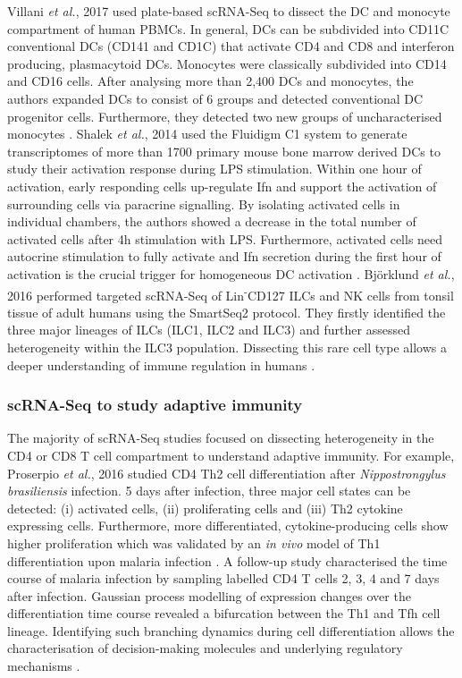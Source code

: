 Villani \emph{et al.}, 2017 used plate-based scRNA-Seq to dissect the \gls{DC} and monocyte compartment of human \glspl{PBMC}. In general, DCs can be subdivided into CD11C\plus{} conventional DCs (CD141\plus{} and CD1C\plus{}) that activate CD4\plus{} and CD8\plus{} and interferon producing, plasmacytoid DCs. Monocytes were classically subdivided into CD14\plus{} and CD16\plus{} cells. After analysing more than 2,400 DCs and monocytes, the authors expanded DCs to consist of 6 groups and detected conventional DC progenitor cells. Furthermore, they detected two new groups of uncharacterised monocytes \citep{Villani2017}. Shalek \emph{et al.}, 2014 used the Fluidigm C1 system to generate transcriptomes of more than 1700 primary mouse bone marrow derived DCs to study their activation response during \gls{LPS} stimulation. Within one hour of activation, early responding cells up-regulate \gls{Ifn}\textbeta{} and support the activation of surrounding cells via paracrine signalling. By isolating activated cells in individual chambers, the authors showed a decrease in the total number of activated cells after 4h stimulation with LPS. Furthermore, activated cells need autocrine stimulation to fully activate and Ifn\textbeta{} secretion during the first hour of activation is the crucial trigger for homogeneous DC activation \citep{Shalek2014}. Bj\"o{}rklund \emph{et al.}, 2016 performed targeted scRNA-Seq of Lin\textsuperscript{-}CD127\plus{} \glspl{ILC} and NK cells from tonsil tissue of adult humans using the SmartSeq2 protocol. They firstly identified the three major lineages of ILCs (ILC1, ILC2 and ILC3) and further assessed heterogeneity within the ILC3 population. Dissecting this rare cell type allows a deeper understanding of immune regulation in humans \citep{Bjorklund2016}. 

\subsubsection{scRNA-Seq to study adaptive immunity}

The majority of scRNA-Seq studies focused on dissecting heterogeneity in the CD4\plus{} or CD8\plus{} T cell compartment to understand adaptive immunity. For example, Proserpio \emph{et al.}, 2016 studied CD4\plus{} Th2 cell differentiation after \textit{Nippostrongylus brasiliensis} infection. 5 days after infection, three major cell states can be detected: (i) activated cells, (ii) proliferating cells and (iii) Th2 cytokine expressing cells. Furthermore, more differentiated, cytokine-producing cells show higher proliferation which was validated by an \emph{in vivo} model of Th1 differentiation upon malaria infection \citep{Proserpio2016}. A follow-up study characterised the time course of malaria infection by sampling labelled CD4\plus{} T cells 2, 3, 4 and 7 days after infection. Gaussian process modelling of expression changes over the differentiation time course revealed a bifurcation between the Th1 and \gls{Tfh} cell lineage. Identifying such branching dynamics during cell differentiation allows the characterisation of decision-making molecules and underlying regulatory mechanisms \citep{Lonnberg2017}. \\

